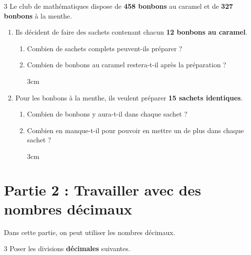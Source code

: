 \documentclass[a4paper]{book}
\begin{document}
{    \begin{exerciceNote}{3}
        Le club de mathématiques dispose de \textbf{458 bonbons} au caramel et de \textbf{327 bonbons} à la menthe.

        \begin{enumerate}[leftmargin=*]
            \item Ils décident de faire des sachets contenant chacun \textbf{12 bonbons au caramel}.
            \begin{enumerate}[leftmargin=*]
                \item Combien de sachets complets peuvent-ils préparer ?
                \item Combien de bonbons au caramel restera-t-il après la préparation ?

                \begin{ZoneReponse}{3cm}
                \end{ZoneReponse}
            \end{enumerate}
            \item Pour les bonbons à la menthe, ils veulent préparer \textbf{15 sachets identiques}.
            \begin{enumerate}[leftmargin=*]
                \item Combien de bonbons y aura-t-il dans chaque sachet ?
                \item Combien en manque-t-il pour pouvoir en mettre un de plus dans chaque sachet ?

                \begin{ZoneReponse}{3cm}
                \end{ZoneReponse}
            \end{enumerate}
        \end{enumerate}
    \end{exerciceNote}


\newpage


\raggedright
\section*{Partie 2 : Travailler avec des nombres décimaux}
Dans cette partie, on peut utiliser les nombres décimaux.

    
    \begin{exerciceNote}{3}
        Poser les divisions \textbf{décimales} suivantes.

        \medskip

        \begin{minipage}{0.45\linewidth}
            \quad {}
    

\end{minipage}
\end{exerciceNote}}
\end{document}
